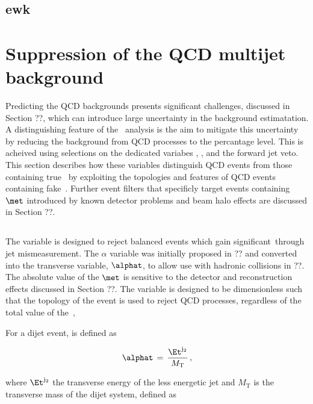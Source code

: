 \subsection{ewk}
\label{sec:ewk-background-intro}


\section{Suppression of the QCD multijet background}
\label{sec:important-variables}

Predicting the QCD backgrounds presents significant challenges, discussed in Section ??, which
can introduce large uncertainty in the background estimatation. A distinguishing feature
of the \alphat~analysis is the aim to mitigate this uncertainty by reducing the 
background from QCD processes to the percantage level. This is acheived using selections on
the dedicated variabes \alphat, \bdphi, \mhtmet and the forward jet veto. This section
describes how these variables distinguish QCD events from those containing true~\met
by exploiting the topologies and features of QCD events containing fake~\met. Further
event filters that specificly target events containing $\met$ introduced by
known detector problems and beam halo effects are discussed in Section ??.

\subsection{\alphat}
The \alphat variable is designed to reject balanced events which gain significant~\met through
jet mismeasurement. The $\alpha$ variable was initially proposed in ?? and converted into the
transverse variable, $\alphat$, to allow use with hadronic collisions in ??. The absolute
value of the $\met$ is sensitive to the detector and reconstruction effects discussed in Section ??. 
The \alphat variable is designed to be dimensionless such that the topology of the event is used to reject 
QCD processes, regardless of the total value of the~\met, 

For a dijet event, \alphat is defined as

\begin{equation}
\label{eq:alphat}
\alphat\, =\, \frac{\Et^{{\rm j}_2}}{M_\text{T}} \, ,
\end{equation}

where $\Et^{\rm j_2}$ the transverse energy of the 
less energetic jet and $M_\text{T}$ is the transverse
mass of the dijet system, defined as 

